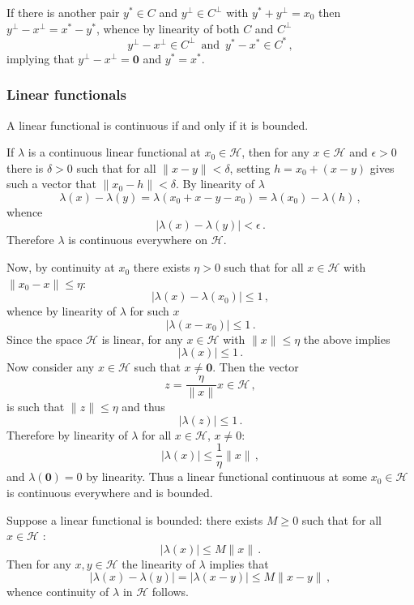 \documentclass[a4paper]{article}
\newcommand{\Hcal}{\mathcal{H}}
\begin{document}
If there is another pair $y^*\in C$ and $y^\perp\in C^\perp$ with $y^*+y^\perp = x_0$
then $y^\perp-x^\perp = x^* - y^*$, whence by linearity of both $C$ and $C^\perp$
\[ y^\perp-x^\perp \in C^\perp\,\text{ and }\, y^*-x^*\in C^*\,, \]
implying that $y^\perp-x^\perp = \mathbf{0}$ and $y^*=x^*$.


\subsubsection{Linear functionals} %
\label{ssub:linear_functionals}

A linear functional is continuous if and only if it is bounded.

If $\lambda$ is a continuous linear functional at $x_0\in\Hcal$, then for any $x\in\Hcal$
and $\epsilon>0$ there is $\delta>0$ such that for all $\|x-y\|<\delta$, setting
$h = x_0 + (x-y)$ gives such a vector that $\|x_0-h\|<\delta$. By linearity of $\lambda$
\[
\lambda(x) - \lambda(y) = \lambda(x_0 + x - y - x_0) = \lambda(x_0) - \lambda(h)\,,
\]
whence
\[
\bigl\lvert \lambda(x) - \lambda(y) \bigr\rvert < \epsilon \,.
\]
Therefore $\lambda$ is continuous everywhere on $\Hcal$.

Now, by continuity at $x_0$ there exists $\eta > 0$ such that for all $x\in \Hcal$
with $\|x_0-x\| \leq \eta$:
\[ \bigl\lvert \lambda(x) - \lambda(x_0) \bigr\rvert \leq 1 \,, \]
whence by linearity of $\lambda$ for such $x$
\[ \bigl\lvert \lambda(x-x_0) \bigr\rvert \leq 1 \,. \]
Since the space $\Hcal$ is linear, for any $x\in \Hcal$ with $\|x\|\leq \eta$ the
above implies
\[ \bigl\lvert \lambda(x) \bigr\rvert \leq 1 \,. \]
Now consider any $x\in \Hcal$ such that $x\neq \mathbf{0}$. Then the vector
\[ z = \frac{\eta}{\|x\|} x \in \Hcal\,, \]
is such that $\|z\|\leq \eta$ and thus
\[ \bigl\lvert \lambda(z) \bigr\rvert \leq 1 \,. \]
Therefore by linearity of $\lambda$ for all $x\in\Hcal$, $x\neq 0$:
\[ | \lambda(x) | \leq \frac{1}{\eta} \|x\| \,, \]
and $\lambda(\mathbf{0}) = 0$ by linearity. Thus a linear functional continuous at
some $x_0\in\Hcal$ is continuous everywhere and is bounded.

Suppose a linear functional is bounded: there exists $M\geq 0$ such that for all
$x\in\Hcal$ :
\[ \bigl\lvert \lambda(x) \bigr\rvert \leq M \|x\| \,. \]
Then for any $x,y\in\Hcal$ the linearity of $\lambda$ implies that
\[
\bigl\lvert \lambda(x) - \lambda(y) \bigr\rvert
= \bigl\lvert \lambda(x - y) \bigr\rvert 
\leq M \|x-y\|\,,
\]
whence continuity of $\lambda$ in $\Hcal$ follows.
\end{document}
